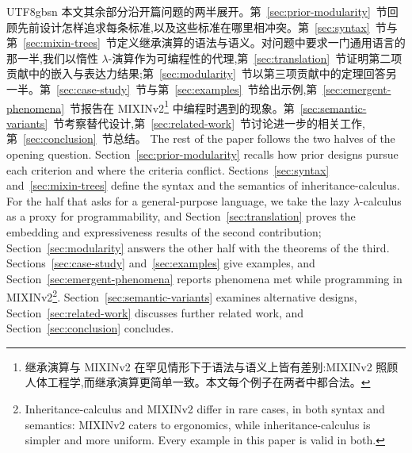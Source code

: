\begin{CJK*}{UTF8}{gbsn}
\ifPaperChinese
本文其余部分沿开篇问题的两半展开。第~\ref{sec:prior-modularity}~节回顾先前设计怎样追求每条标准,以及这些标准在哪里相冲突。第~\ref{sec:syntax}~节与第~\ref{sec:mixin-trees}~节定义继承演算的语法与语义。对问题中要求一门通用语言的那一半,我们以惰性 $\lambda$-演算作为可编程性的代理,第~\ref{sec:translation}~节证明第二项贡献中的嵌入与表达力结果;第~\ref{sec:modularity}~节以第三项贡献中的定理回答另一半。第~\ref{sec:case-study}~节与第~\ref{sec:examples}~节给出示例,第~\ref{sec:emergent-phenomena}~节报告在 MIXINv2\footnote{继承演算与 MIXINv2 在罕见情形下于语法与语义上皆有差别:MIXINv2 照顾人体工程学,而继承演算更简单一致。本文每个例子在两者中都合法。} 中编程时遇到的现象。第~\ref{sec:semantic-variants}~节考察替代设计,第~\ref{sec:related-work}~节讨论进一步的相关工作,第~\ref{sec:conclusion}~节总结。
\else
The rest of the paper follows the two halves of the opening question.
Section~\ref{sec:prior-modularity} recalls how prior designs pursue each criterion and where the
criteria conflict.
Sections~\ref{sec:syntax} and~\ref{sec:mixin-trees} define the syntax and the semantics of
inheritance-calculus. For the half that asks for a general-purpose language, we take the lazy
$\lambda$-calculus as a proxy for programmability, and Section~\ref{sec:translation} proves the
embedding and expressiveness results of the second contribution; Section~\ref{sec:modularity} answers
the other half with the theorems of the third. Sections~\ref{sec:case-study} and~\ref{sec:examples} give examples, and
Section~\ref{sec:emergent-phenomena} reports phenomena met while programming in MIXINv2\footnote{Inheritance-calculus and MIXINv2 differ in rare cases, in both syntax and semantics: MIXINv2 caters to ergonomics, while inheritance-calculus is simpler and more uniform. Every example in this paper is valid in both.}.
Section~\ref{sec:semantic-variants} examines alternative designs, Section~\ref{sec:related-work}
discusses further related work, and Section~\ref{sec:conclusion} concludes.
\fi


\end{CJK*}
